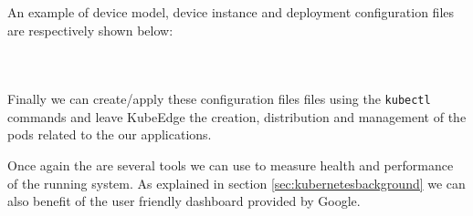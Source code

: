An example of device model, device instance and deployment configuration files are respectively shown below:

\inputminted[frame=single,
framesep=2mm,
baselinestretch=1.2,
fontsize=\footnotesize,
linenos,
breaklines]{yaml}{sourcecode/led-light-device-model.yaml}


\inputminted[frame=single,
framesep=2mm,
baselinestretch=1.2,
fontsize=\footnotesize,
linenos,
breaklines]{yaml}{sourcecode/led-light-device-instance.yaml}


\inputminted[frame=single,
framesep=2mm,
baselinestretch=1.2,
fontsize=\footnotesize,
linenos,
breaklines]{yaml}{sourcecode/deployment.yaml}


Finally we can create/apply these configuration files files using the \texttt{kubectl} commands and leave KubeEdge the creation, distribution and management of the pods related to the our applications.

Once again the are several tools we can use to measure health and performance of the running system. As explained in section \ref{sec:kubernetesbackground} we can also benefit of the user friendly dashboard provided by Google.


\clearpage
\thispagestyle{empty}



















